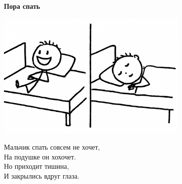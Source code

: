 \vspace*{\fill}
\begin{center}
  {\huge\textbf{Пора спать}}

  \vspace{1.5em}  \includegraphics[width=0.7\textwidth]{pictures/sleep.png}
  \vspace{4em}
  \parbox{0.6\textwidth}{
    \LARGE
    \begin{spacing}{1.2}
      Мальчик спать совсем не хочет,\\
      На подушке он хохочет.\\
      Но приходит тишина,\\
      И закрылись вдруг глаза. %
    \end{spacing}
      
  }
\end{center}
\vspace*{\fill}